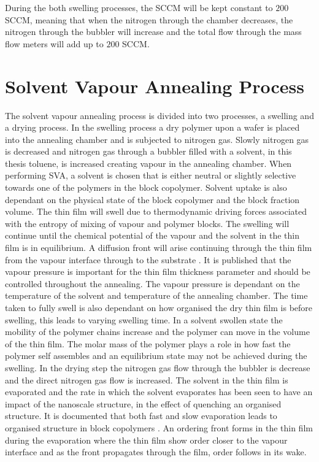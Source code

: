 \documentclass[MasterThesisMain.tex]{subfiles}
\begin{document}
During the both swelling processes, the SCCM will be kept constant to $200$ SCCM, meaning that when the nitrogen through the chamber decreases, the nitrogen through the bubbler will increase and the total flow through the mass flow meters will add up to $200$ SCCM.


\section{Solvent Vapour Annealing Process}
The solvent vapour annealing process is divided into two processes, a swelling and a drying process. In the swelling process a dry polymer upon a wafer is placed into the annealing chamber and is subjected to nitrogen gas. Slowly nitrogen gas is decreased and nitrogen gas through a bubbler filled with a solvent, in this thesis toluene, is increased creating vapour in the annealing chamber. When performing SVA, a solvent is chosen that is either neutral or slightly selective towards one of the polymers in the block copolymer. Solvent uptake is also dependant on the physical state of the block copolymer and the block fraction volume. The thin film will swell due to thermodynamic driving forces associated with the entropy of mixing of vapour and polymer blocks. The swelling will continue until the chemical potential of the vapour and the solvent in the thin film is in equilibrium. A diffusion front will arise continuing through the thin film from the vapour interface through to the substrate \cite{SVABCP}. It is published that the vapour pressure is important for the thin film thickness parameter and should be controlled throughout the annealing. The vapour pressure is dependant on the temperature of the solvent and temperature of the annealing chamber. The time taken to fully swell is also dependant on how organised the dry thin film is before swelling, this leads to varying swelling time. In a solvent swollen state the mobility of the polymer chains increase and the polymer can move in the volume of the thin film. The molar mass of the polymer plays a role in how fast the polymer self assembles and an equilibrium state may not be achieved during the swelling. In the drying step the nitrogen gas flow through the bubbler is decrease and the direct nitrogen gas flow is increased. The solvent in the thin film is evaporated and the rate in which the solvent evaporates has been seen to have an impact of the nanoscale structure, in the effect of quenching an organised structure. It is documented that both fast and slow evaporation leads to organised structure in block copolymers \cite{SVABCP}. An ordering front forms in the thin film during the evaporation where the thin film show order closer to the vapour interface and as the front propagates through the film, order follows in its wake\cite{SVABCP}. 
\end{document}
